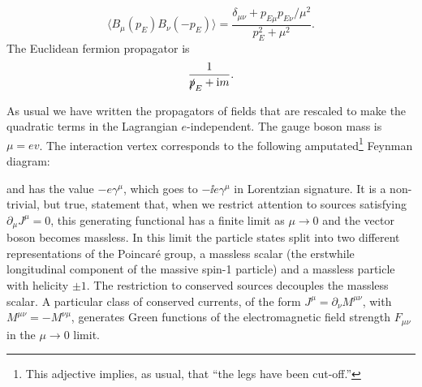 \begin{equation}
  \langle B_\mu(p_E)B_\nu(-p_E)\rangle
  =\frac{\delta_{\mu\nu}+p_{E\mu}p_{E\nu}/\mu^2}{p_E^2+\mu^2}.
  \label{eq:6.3}
\end{equation}
The Euclidean fermion propagator is
\begin{equation*}
  \frac{1}{\slashed p_E+\mathrm{i} m}.
\end{equation*}

As usual we have written the propagators of fields that are rescaled to make the
quadratic terms in the Lagrangian $e$-independent. The gauge boson mass is $\mu=ev$.
The interaction vertex corresponds to the following amputated\footnote[1]{This adjective implies, as usual, that ``the legs have been cut-off.''} Feynman diagram:

\begin{center}

\end{center}

and has the value $-e\gamma^\mu$, which goes to $-\ii e\gamma^\mu$ in Lorentzian signature. It is a non-trivial,
but true, statement that, when we restrict attention to sources satisfying $\partial_\mu J^\mu=0$, this
generating functional has a finite limit as $\mu\to0$ and the vector boson becomes massless.
In this limit the particle states split into two different representations of the Poincaré
group, a massless scalar (the erstwhile longitudinal component of the massive spin-1
particle) and a massless particle with helicity $\pm1$. The restriction to conserved sources
decouples the massless scalar. A particular class of conserved currents, of the form
$J^\mu=\partial_\nu M^{\mu\nu}$, with $M^{\mu\nu}=-M^{\nu\mu}$, generates Green functions of the electromagnetic
field strength $F_{\mu\nu}$ in the $\mu\to0$ limit.

